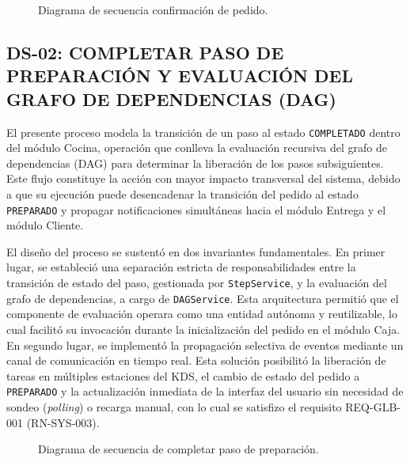 \begin{landscape}
\begin{figure}[H]
    \centering
    
    \caption{Diagrama de secuencia confirmación de pedido.}
    \label{fig:diagrama-secuencia-confirmacion-pedido}
\end{figure}
\end{landscape}

\subsection{DS-02: COMPLETAR PASO DE PREPARACIÓN Y EVALUACIÓN DEL GRAFO DE DEPENDENCIAS (DAG)}
El presente proceso modela la transición de un paso al estado \texttt{COMPLETADO} dentro del módulo Cocina, operación que conlleva la evaluación recursiva del grafo de dependencias (DAG) para determinar la liberación de los pasos subsiguientes. Este flujo constituye la acción con mayor impacto transversal del sistema, debido a que su ejecución puede desencadenar la transición del pedido al estado \texttt{PREPARADO} y propagar notificaciones simultáneas hacia el módulo Entrega y el módulo Cliente.

El diseño del proceso se sustentó en dos invariantes fundamentales. En primer lugar, se estableció una separación estricta de responsabilidades entre la transición de estado del paso, gestionada por \texttt{StepService}, y la evaluación del grafo de dependencias, a cargo de \texttt{DAGService}. Esta arquitectura permitió que el componente de evaluación operara como una entidad autónoma y reutilizable, lo cual facilitó su invocación durante la inicialización del pedido en el módulo Caja. En segundo lugar, se implementó la propagación selectiva de eventos mediante un canal de comunicación en tiempo real. Esta solución posibilitó la liberación de tareas en múltiples estaciones del KDS, el cambio de estado del pedido a \texttt{PREPARADO} y la actualización inmediata de la interfaz del usuario sin necesidad de sondeo (\textit{polling}) o recarga manual, con lo cual se satisfizo el requisito REQ-GLB-001 (RN-SYS-003).
\begin{landscape}
\begin{figure}[H]
    \centering
    
    \caption{Diagrama de secuencia de completar paso de preparación.}
    \label{fig:diagrama-secuencia-completar-paso}
\end{figure}
\end{landscape}
